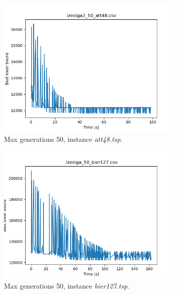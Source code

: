 \begin{figure}[!h]
	\begin{subfigure}{.5\columnwidth}
		\centering
		\includegraphics[width=\columnwidth]{../res/ga_50_att48.png}
		\caption{Max generations 50, instance \textit{att48.tsp}.}
		\label{fig:ga_50_att48}
	\end{subfigure}
	\begin{subfigure}{.5\columnwidth}
		\centering
		\includegraphics[width=\columnwidth]{../res/ga_50_bier127.png}
		\caption{Max generations 50, instance \textit{bier127.tsp}.}
		\label{fig:ga_50_bier127}
	\end{subfigure}
	\begin{subfigure}{.5\columnwidth}
		\centering

\end{subfigure}
\end{figure}
